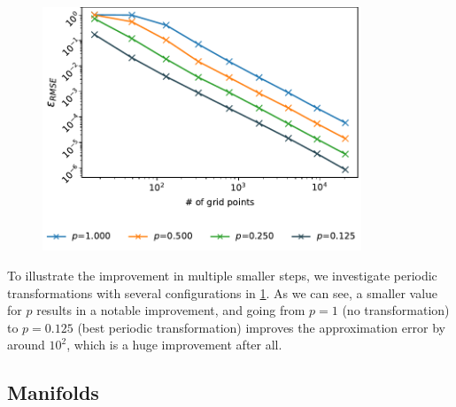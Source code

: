 \documentclass[
  a4paper,  %
  twoside,  %
  bibliography=totoc,
  headsepline,
  cleardoublepage=empty,
  parskip=half,
  draft=false
]{scrbook}
\begin{document}
\begin{mdframed}[style=style]
\vspace{2mm}
\begin{figure}[H]
        \centering
\begin{minipage}{.4\textwidth}
        \centering
    \end{minipage}%
    \begin{minipage}{0.6\textwidth}
        \centering
\includegraphics[width=0.85\textwidth]{graphics/periodic}
    \end{minipage}
\label{fig:periodic}
\end{figure}
\end{mdframed}

To illustrate the improvement in multiple smaller steps, we investigate periodic transformations with several configurations in \cref{fig:periodic}.
As we can see, a smaller value for $p$ results in a notable improvement, and going from $p=1$ (no transformation) to $p=0.125$ (best periodic transformation) improves the approximation error by around $10^2$, which is a huge improvement after all.

\subsection{Manifolds}
\end{document}
